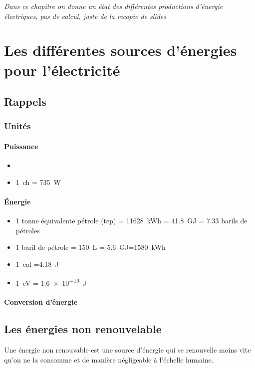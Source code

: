 \documentclass[main.tex]{subfiles}
\begin{document}
\emph{Dans ce chapitre on donne un état des différentes productions d'énergie électriques, pas de calcul, juste de la recopie de slides}

\section{Les différentes sources d'énergies pour l'électricité}
\subsection{Rappels}

\subsubsection{Unités}
\paragraph{Puissance}
\begin{itemize}
\item \item \SI{1}{ch} = \SI{735}{W}
\end{itemize}
\paragraph{Énergie}

\begin{itemize}
\item 1 tonne équivalente pétrole (tep) = \SI{11628}{kWh} = \SI{41,8}{GJ} = \num{7,33} barils de pétroles
\item \num{1} baril de pétrole = \SI{150}{L} = \SI{5,6}{GJ}=\SI{1580}{kWh}
\item \SI{1}{cal} =\SI{4,18}{J}
\item \SI{1}{eV} = \SI{1,6e-19}{J}
\end{itemize}

\paragraph{Conversion d'énergie}

\subsection{Les énergies non renouvelable}
\begin{defin}
  Une énergie non renouvable est une source d'énergie qui se renouvelle moins vite qu'on ne la consomme et de manière négligeable à l'échelle humaine.
\end{defin}
\end{document}
